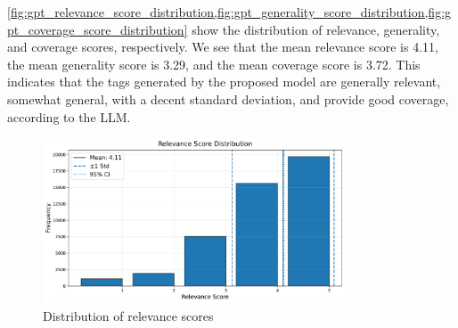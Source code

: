 


\cref{fig:gpt_relevance_score_distribution,fig:gpt_generality_score_distribution,fig:gpt_coverage_score_distribution} show the distribution of relevance, generality, and coverage scores, respectively. We see that the mean relevance score is 4.11, the mean generality score is 3.29, and the mean coverage score is 3.72. This indicates that the tags generated by the proposed model are generally relevant, somewhat general, with a decent standard deviation, and provide good coverage, according to the LLM.

\begin{figure}[h]
    \centering
    \includegraphics[width=0.8\textwidth]{figures/gpt_relevance_score_distribution.pdf}
    \caption{Distribution of relevance scores}
    \label{fig:gpt_relevance_score_distribution}
\end{figure}

